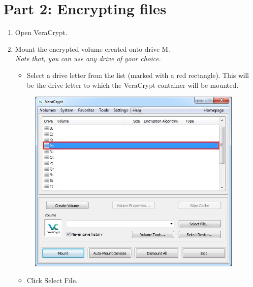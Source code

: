 \documentclass{tufte-handout}
\begin{document}
\section{Part 2: Encrypting files}
\begin{enumerate}
	\item Open VeraCrypt.
	\item Mount the encrypted volume created onto drive M. \\
	\textit{Note that, you can use any drive of your choice.}
	\begin{itemize}
		\item  Select a drive letter from the list (marked with a red rectangle). This will be the drive letter to which the VeraCrypt container will be mounted.
	\end{itemize}
	\begin{figure}%
		\includegraphics[width=\linewidth]{img/vc_mount_1.png}
	\end{figure}
	\FloatBarrier
	\begin{itemize}
		\item  Click Select File.
	\end{itemize}
	\begin{figure}%

\end{figure}
\end{enumerate}
\end{document}
